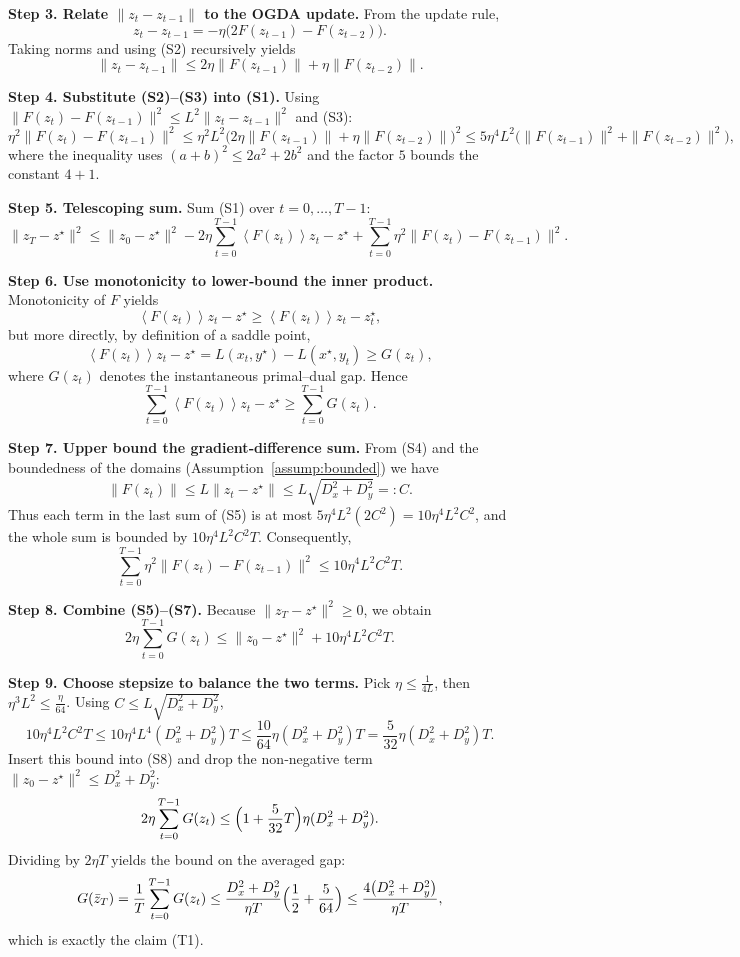 \documentclass[11pt]{article}
\newcommand{\inner}[1]{\left\langle#1\right\rangle}
\begin{document}
\noindent\textbf{Step 3. Relate $\|z_t-z_{t-1}\|$ to the OGDA update.}  
From the update rule,
\[
z_t-z_{t-1}= -\eta\bigl(2F(z_{t-1})-F(z_{t-2})\bigr).
\]
Taking norms and using (S2) recursively yields
\[
\|z_t-z_{t-1}\|\le 2\eta\|F(z_{t-1})\|+\eta\|F(z_{t-2})\|.
\tag{S3}
\]

\noindent\textbf{Step 4. Substitute (S2)–(S3) into (S1).}  
Using $\|F(z_t)-F(z_{t-1})\|^2\le L^2\|z_t-z_{t-1}\|^2$ and (S3):
\[
\eta^2\|F(z_t)-F(z_{t-1})\|^2
\le \eta^2L^2\bigl(2\eta\|F(z_{t-1})\|+\eta\|F(z_{t-2})\|\bigr)^2
\le 5\eta^4L^2\bigl(\|F(z_{t-1})\|^2+\|F(z_{t-2})\|^2\bigr),
\tag{S4}
\]
where the inequality uses $(a+b)^2\le2a^2+2b^2$ and the factor $5$ bounds the constant $4+1$.

\noindent\textbf{Step 5. Telescoping sum.}  
Sum (S1) over $t=0,\dots,T-1$:
\[
\|z_T-z^\star\|^2
\le\|z_0-z^\star\|^2
-2\eta\sum_{t=0}^{T-1}\inner{F(z_t)}{z_t-z^\star}
+\sum_{t=0}^{T-1}\eta^2\|F(z_t)-F(z_{t-1})\|^2.
\tag{S5}
\]

\noindent\textbf{Step 6. Use monotonicity to lower‑bound the inner product.}  
Monotonicity of $F$ yields
\[
\inner{F(z_t)}{z_t-z^\star}\ge \inner{F(z_t)}{z_t-z_t^\star},
\]
but more directly, by definition of a saddle point,
\[
\inner{F(z_t)}{z_t-z^\star}=L(x_t,y^\star)-L(x^\star,y_t)\ge G(z_t),
\]
where $G(z_t)$ denotes the instantaneous primal–dual gap. Hence
\[
\sum_{t=0}^{T-1}\inner{F(z_t)}{z_t-z^\star}\ge\sum_{t=0}^{T-1}G(z_t).
\tag{S6}
\]

\noindent\textbf{Step 7. Upper bound the gradient‑difference sum.}  
From (S4) and the boundedness of the domains (Assumption~\ref{assump:bounded}) we have
\[
\|F(z_t)\|\le L\|z_t-z^\star\|\le L\sqrt{D_x^2+D_y^2}=:C.
\]
Thus each term in the last sum of (S5) is at most $5\eta^4L^2(2C^2)=10\eta^4L^2C^2$, and the whole sum is bounded by $10\eta^4L^2C^2 T$.
Consequently,
\[
\sum_{t=0}^{T-1}\eta^2\|F(z_t)-F(z_{t-1})\|^2
\le 10\eta^4L^2C^2 T.
\tag{S7}
\]

\noindent\textbf{Step 8. Combine (S5)–(S7).}  
Because $\|z_T-z^\star\|^2\ge0$, we obtain
\[
2\eta\sum_{t=0}^{T-1}G(z_t)
\le\|z_0-z^\star\|^2+10\eta^4L^2C^2 T.
\tag{S8}
\]

\noindent\textbf{Step 9. Choose stepsize to balance the two terms.}  
Pick $\eta\le\frac{1}{4L}$, then $\eta^3L^2\le\frac{\eta}{64}$. Using $C\le L\sqrt{D_x^2+D_y^2}$,
\[
10\eta^4L^2C^2 T
\le 10\eta^4L^4(D_x^2+D_y^2)T
\le \frac{10}{64}\eta (D_x^2+D_y^2) T
= \frac{5}{32}\eta (D_x^2+D_y^2)T.
\]
Insert this bound into (S8) and drop the non‑negative term $\|z_0-z^\star\|^2\le D_x^2+D_y^2$:
\[
2\eta\sum_{t=0}^{T-1}G(z_t)
\le \Bigl(1+\frac{5}{32}T\Bigr)\eta (D_x^2+D_y^2).
\]
Dividing by $2\eta T$ yields the bound on the averaged gap:
\[
G(\bar z_T)=\frac{1}{T}\sum_{t=0}^{T-1}G(z_t)
\le\frac{D_x^2+D_y^2}{\eta T}\Bigl(\frac12+\frac{5}{64}\Bigr)
\le\frac{4\bigl(D_x^2+D_y^2\bigr)}{\eta T},
\]
which is exactly the claim (T1). \hfill\qedsymbol
\end{document}
